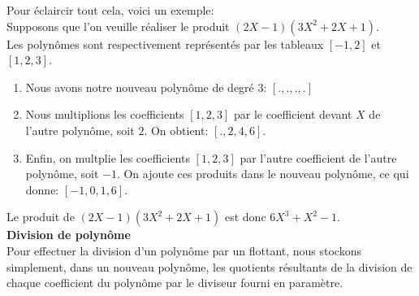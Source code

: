 Pour éclaircir tout cela, voici un exemple:\vspace{4pt}\\
Supposons que l'on veuille réaliser le produit $(2X-1)(3X^2+2X+1)$.\\
Les polynômes sont respectivement représentés par les tableaux $[-1, 2]$ et $[1, 2, 3]$.
\begin{enumerate}
    \item Nous avons notre nouveau polynôme de degré $3$: $[.,.,.,.]$
    \item Nous multiplions les coefficients $[1,2,3]$ par le coefficient devant $X$ de l'autre polynôme, soit $2$. On obtient: $[.,2,4,6]$.
    \item Enfin, on multplie les coefficients $[1,2,3]$ par l'autre coefficient de l'autre polynôme, soit $-1$. On ajoute ces produits dans le nouveau polynôme, ce qui donne: $[-1,0,1,6]$.
\end{enumerate}
Le produit de $(2X-1)(3X^2+2X+1)$ est donc $6X^3+X^2-1$.\vspace{4pt}\\
\textbf{Division de polynôme}\\
Pour effectuer la division d'un polynôme par un flottant, nous stockons simplement, dans un nouveau polynôme, les quotients résultants de la division de chaque coefficient du polynôme par le diviseur fourni en paramètre.
\newpage
